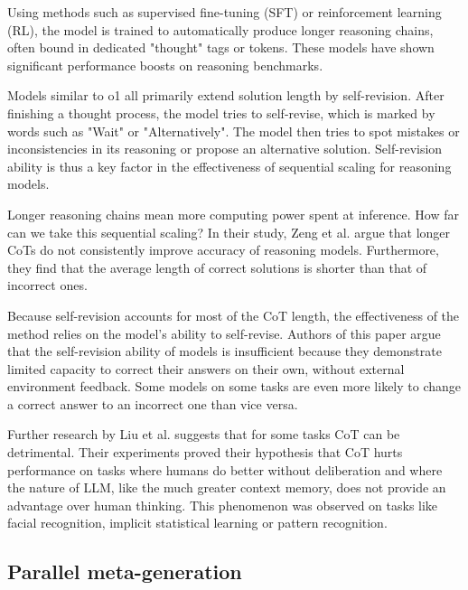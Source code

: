 Using methods such as supervised fine-tuning (SFT) or reinforcement learning (RL), the model is trained to
automatically produce longer reasoning chains, often bound in dedicated "thought" tags or tokens. 
These models have shown significant performance boosts on reasoning benchmarks\cite{openai2024openaio1card}\cite{deepseekai2025deepseekr1incentivizingreasoningcapability}.

Models similar to o1 all primarily extend solution length by self-revision\cite{zeng2025revisitingtesttimescalingo1like}.
After finishing a thought process, the model tries to self-revise, which is marked by words such as "Wait" or "Alternatively". 
The model then tries to spot mistakes or inconsistencies in its reasoning or propose an alternative solution. 
Self-revision ability is thus a key factor in the effectiveness of sequential scaling for reasoning models\cite{zeng2025revisitingtesttimescalingo1like}.

Longer reasoning chains mean more computing power spent at inference. How far can we take this sequential scaling?
In their study, Zeng et al.\cite{zeng2025revisitingtesttimescalingo1like} argue that longer CoTs do not consistently improve accuracy of reasoning models.
Furthermore, they find that the average length of correct solutions is shorter than that of incorrect ones. 

Because self-revision accounts for most of the CoT length, the effectiveness of the method relies on the model's ability to self-revise.
Authors of this paper argue that the self-revision ability of models is insufficient because they demonstrate limited capacity to correct their answers
on their own, without external environment feedback. Some models on some tasks are even more likely to change a correct answer to an incorrect one than vice versa.

Further research by Liu et al.\cite{liu2024mindstepbystep} suggests that for some tasks CoT can be detrimental.
Their experiments proved their hypothesis that CoT hurts performance on tasks where humans do better without deliberation
and where the nature of LLM, like the much greater context memory, does not provide an advantage over human thinking. 
This phenomenon was observed on tasks like facial recognition, implicit statistical learning or pattern recognition.

\subsection{Parallel meta-generation}

